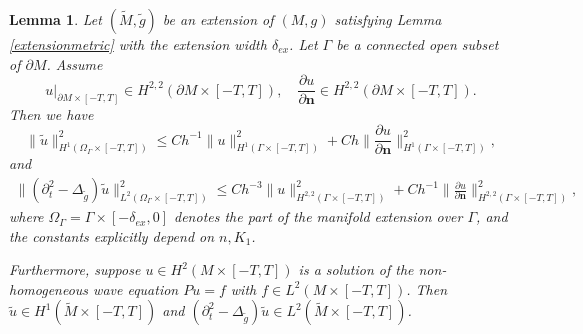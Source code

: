 \documentclass[11pt,letterpaper]{amsart}
\numberwithin{equation}{section}
\theoremstyle{definition}
\theoremstyle{plain}
\theoremstyle{definition}
\theoremstyle{plain}
\newtheorem{extension}[main1]{Lemma}
\theoremstyle{definition}
\theoremstyle{plain}
\begin{document}
\begin{extension}\label{extension}
Let $(\widetilde{M},\widetilde{g})$ be an extension of $(M,g)$ satisfying Lemma \ref{extensionmetric} with the extension width $\delta_{ex}$. Let $\Gamma$ be a connected open subset of $\partial M$. Assume
$$u|_{\partial M\times [-T,T]}\in H^{2,2}(\partial M \times [-T,T]),\quad \frac{\partial u}{\partial \mathbf{n}} \in H^{2,2}(\partial M \times [-T,T]).$$
Then we have 
$$\|\widetilde{u}\|^2_{H^1(\Omega_{\Gamma}\times[-T,T])}\leqslant Ch^{-1}\|u\|^2_{H^1(\Gamma\times [-T,T])}+Ch \big\|\frac{\partial u}{\partial \mathbf{n}} \big\|^2_{H^1(\Gamma\times [-T,T])},$$
and
\begin{eqnarray*}
\|(\partial_{t}^2 -\Delta_{\widetilde{g}})\widetilde{u}\|^2_{L^2(\Omega_{\Gamma}\times [-T,T])}
\leqslant Ch^{-3}\|u\|^2_{H^{2,2}(\Gamma\times [-T,T])} + Ch^{-1}\big\|\frac{\partial u}{\partial \mathbf{n}} \big\|^2_{H^{2,2}(\Gamma\times [-T,T])},
\end{eqnarray*}
where $\Omega_{\Gamma}=\Gamma\times[-\delta_{ex},0]$ denotes the part of the manifold extension over $\Gamma$, and the constants explicitly depend on $n,K_1$.

Furthermore, suppose $u\in H^2(M\times[-T,T])$ is a solution of the non-homogeneous wave equation $Pu=f$ with $f\in L^2(M\times [-T,T])$. Then $\widetilde{u}\in H^1(\widetilde{M}\times [-T,T])$ and $(\partial_{t}^2 -\Delta_{\widetilde{g}})\widetilde{u} \in L^2(\widetilde{M}\times [-T,T])$.
\end{extension}
\end{document}
